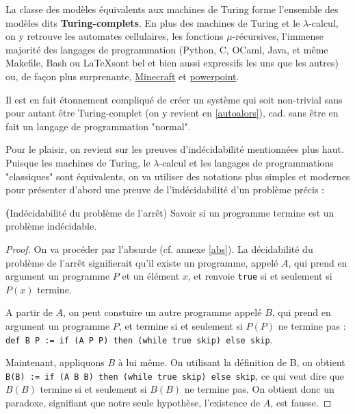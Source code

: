 La classe des modèles équivalents aux machines de Turing forme l'ensemble des modèles dits \textbf{Turing-complets}. En plus des machines de Turing et le $\lambda$-calcul, on y retrouve les automates cellulaires, les fonctions $\mu$-récursives, l'immense majorité des langages de programmation (Python, C, OCaml, Java, et même Makefile, Bash ou \LaTeX sont bel et bien aussi expressifs les uns que les autres) ou, de façon plus surprenante, \href{https://gaming.stackexchange.com/questions/20219/is-minecraft-turing-complete}{Minecraft} et \href{https://www.youtube.com/watch?v=uNjxe8ShM-8}{powerpoint}.

Il est en fait étonnement compliqué de créer un système qui soit non-trivial sans pour autant être Turing-complet (on y revient en \ref{autoalors}), cad. sans être en fait un langage de programmation "normal".

Pour le plaisir, on revient sur les preuves d'indécidabilité mentionnées plus haut. Puisque les machines de Turing, le $\lambda$-calcul et les langages de programmations "classiques" sont équivalents, on va utiliser des notations plus simples et modernes pour présenter d'abord une preuve de l'indécidabilité d'un problème précis :


\begin{theorem}{\textbf(Indécidabilité du problème de l'arrêt)} Savoir si un programme termine est un problème indécidable.
\end{theorem}

\begin{proof}
On va procéder par l'absurde (cf. annexe \ref{abs}). La décidabilité du problème de l'arrêt signifierait qu'il existe un programme, appelé $A$, qui prend en argument un programme $P$ et un élément $x$, et renvoie \verb!true! si et seulement si $P(x)$ termine.

A partir de $A$, on peut constuire un autre programme appelé $B$, qui prend en argument un programme $P$, et termine si et seulement si $P(P)$ ne termine pas :\\
\verb!def B P := if (A P P) then (while true skip) else skip!.

Maintenant, appliquons $B$ à lui même. On utilisant la définition de B, on obtient\\ \verb!B(B) := if (A B B) then (while true skip) else skip!, ce qui veut dire que $B(B)$ termine si et seulement si $B(B)$ ne termine pas. On obtient donc un paradoxe, signifiant que notre seule hypothèse, l'existence de $A$, est fausse.
\end{proof}

